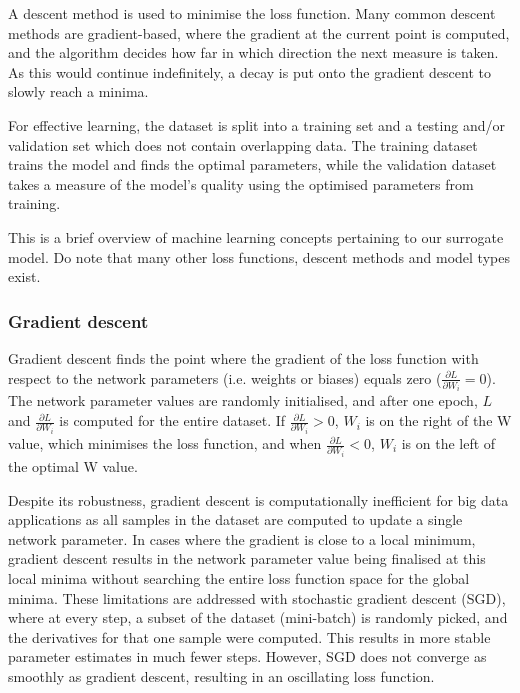 \documentclass[11pt]{article}
\begin{document}
A descent method is used to minimise the loss function. Many common descent methods are gradient-based, where the gradient at the current point is computed, and the algorithm decides how far in which direction the next measure is taken. As this would continue indefinitely, a decay is put onto the gradient descent to slowly reach a minima. 

For effective learning, the dataset is split into a training set and a testing and/or validation set which does not contain overlapping data. The training dataset trains the model and finds the optimal parameters, while the validation dataset takes a measure of the model's quality using the optimised parameters from training.

This is a brief overview of machine learning concepts pertaining to our surrogate model. Do note that many other loss functions, descent methods and model types exist.

\subsubsection{Gradient descent}
Gradient descent finds the point where the gradient of the loss function with respect to the network parameters (i.e. weights or biases) equals zero ($\frac{\partial L}{\partial W_{i}} = 0$). The network parameter values are randomly initialised, and after one epoch, $L$ and $\frac{\partial L}{\partial W_{i}}$ is computed for the entire dataset. If $\frac{\partial L}{\partial W_{i}} > 0$, $W_{i}$ is on the right of the W value, which minimises the loss function, and when $\frac{\partial L}{\partial W_{i}} < 0$, $W_{i}$ is on the left of the optimal W value.

Despite its robustness, gradient descent is computationally inefficient for big data applications as all samples in the dataset are computed to update a single network parameter. In cases where the gradient is close to a local minimum, gradient descent results in the network parameter value being finalised at this local minima without searching the entire loss function space for the global minima. These limitations are addressed with stochastic gradient descent (SGD), where at every step, a subset of the dataset (mini-batch) is randomly picked, and the derivatives for that one sample were computed. This results in more stable parameter estimates in much fewer steps. However, SGD does not converge as smoothly as gradient descent, resulting in an oscillating loss function.  
\end{document}
